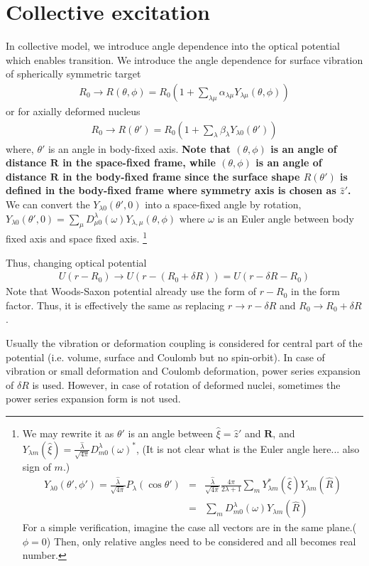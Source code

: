 \documentclass[11pt]{book}
\def\bm{\boldsymbol}
\def\vR{{\bm R}}
\newcommand{\bea}{\begin{eqnarray}}
\newcommand{\eea}{\end{eqnarray}}
\newcommand{\no}{\nonumber \\}
\begin{document}
\section{Collective excitation} 
In collective model, we introduce angle dependence into the optical potential
which enables transition. 
We introduce the angle dependence for surface vibration of spherically symmetric target
\bea 
R_0\to R(\theta,\phi)=
 R_0\left(1+\sum_{\lambda\mu}\alpha_{\lambda\mu}Y_{\lambda\mu}(\theta,\phi)\right) 
\eea 
or for axially deformed nucleus
\bea 
R_0\to R(\theta')= R_0\left(1+\sum_{\lambda}\beta_{\lambda}Y_{\lambda 0}(\theta')\right) 
\eea 
where, $\theta'$ is an angle in body-fixed axis. 
{\bf Note that $(\theta,\phi)$ is an angle of distance $\vR$ in the space-fixed frame,
while $(\theta,\phi)$ is an angle of distance $\vR$ in the body-fixed frame
since the surface shape $R(\theta')$ is defined in the body-fixed frame
where symmetry axis is chosen as $\hat{z}'$. 
} We can convert the $Y_{\lambda 0}(\theta',0)$ into a space-fixed angle 
by rotation, $Y_{\lambda 0}(\theta',0)
  =\sum_{\mu} D^\lambda_{\mu 0}(\omega) Y_{\lambda,\mu}(\theta,\phi)$
  where $\omega$ is an Euler angle between body fixed axis and 
  space fixed axis. 
\footnote{We may rewrite it as $\theta'$ is an angle between $\hat{\xi}=\hat{z}'$
and $\vR$, and $
Y_{\lambda m}(\hat{\xi})
=\frac{\hat{\lambda}}{\sqrt{4\pi}} D^\lambda_{m0}(\omega)^*$, 
(It is not clear what is the Euler angle here... also sign of $m$.)
\bea 
Y_{\lambda 0}(\theta',\phi')=\frac{\hat{\lambda}}{\sqrt{4\pi}}P_\lambda(\cos\theta')
  &=&\frac{\hat{\lambda}}{\sqrt{4\pi}} \frac{4\pi}{2\lambda+1}
   \sum_{m} Y_{\lambda m}^*(\hat{\xi})Y_{\lambda m}(\hat{R}) \no 
  &=&  \sum_{m} D^\lambda_{m0}(\omega) Y_{\lambda m}(\hat{R})
\eea 
For a simple verification, imagine the case all vectors are in the same plane.($\phi=0$) 
Then, only relative angles need to be considered and all becomes real number.  
} 

Thus, changing optical potential
\bea 
U(r-R_0)\to U(r-(R_0+\delta R))= U(r-\delta R-R_0)
\eea 
Note that Woods-Saxon potential already use the form of $r-R_0$ in the form factor. 
Thus, it is effectively the same as replacing $r\to r-\delta R$ and $R_0\to R_0+\delta R$.

Usually the vibration or deformation coupling is considered for central part of the potential
(i.e. volume, surface and Coulomb but no spin-orbit).
In case of vibration or small deformation
and Coulomb deformation, power series expansion of $\delta R$
is used. 
However, in case of rotation of deformed nuclei, sometimes the power series expansion
form is not used. 
\end{document}

